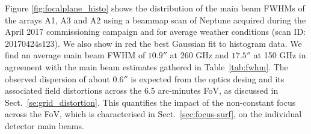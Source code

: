 Figure \ref{fig:focalplane_histo} shows the distribution of the
main beam FWHMs of the arrays A1, A3 and A2 using a beammap
scan of Neptune acquired during the April 2017 commissioning
campaign and for average weather conditions (scan ID: 20170424s123). We also
show in red the best Gaussian fit to histogram data. We find an
average main beam FWHM of $10.9''$ at 260 GHz and $17.5''$ at
150 GHz in agreement with the main beam estimates gathered in
Table~\ref{tab:fwhm}.
The observed dispersion of about $0.6''$ is expected from the optics desing and its associated
field distortions across the 6.5 arc-minutes FoV, as discussed in
Sect.~\ref{se:grid_distortion}. This quantifies the impact of the
non-constant focus across the FoV, which is characterised in
Sect.~\ref{sec:focus-surf}, on the individual detector main beams.  





